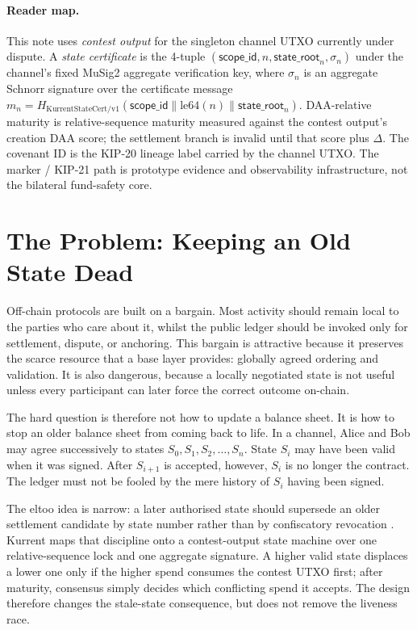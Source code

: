 \documentclass[10pt,a4paper]{article}
\begin{document}
\paragraph{Reader map.} This note uses \emph{contest output} for the singleton channel UTXO currently under dispute. A \emph{state certificate} is the 4-tuple $(\mathsf{scope\_id}, n, \mathsf{state\_root}_n, \sigma_n)$ under the channel's fixed MuSig2 aggregate verification key, where $\sigma_n$ is an aggregate Schnorr signature over the certificate message $m_n = H_{\mathrm{KurrentStateCert/v1}}(\mathsf{scope\_id} \parallel \mathrm{le64}(n) \parallel \mathsf{state\_root}_n)$. DAA-relative maturity is relative-sequence maturity measured against the contest output's creation DAA score; the settlement branch is invalid until that score plus $\Delta$. The covenant ID is the KIP-20 lineage label carried by the channel UTXO. The marker / KIP-21 path is prototype evidence and observability infrastructure, not the bilateral fund-safety core.

\section{The Problem: Keeping an Old State Dead}

Off-chain protocols are built on a bargain. Most activity should remain local to the parties who care about it, whilst the public ledger should be invoked only for settlement, dispute, or anchoring. This bargain is attractive because it preserves the scarce resource that a base layer provides: globally agreed ordering and validation. It is also dangerous, because a locally negotiated state is not useful unless every participant can later force the correct outcome on-chain.

The hard question is therefore not how to update a balance sheet. It is how to stop an older balance sheet from coming back to life. In a channel, Alice and Bob may agree successively to states $S_0, S_1, S_2, \ldots, S_n$. State $S_i$ may have been valid when it was signed. After $S_{i+1}$ is accepted, however, $S_i$ is no longer the contract. The ledger must not be fooled by the mere history of $S_i$ having been signed.

The eltoo idea is narrow: a later authorised state should supersede an older settlement candidate by state number rather than by confiscatory revocation \cite{eltoo}. Kurrent maps that discipline onto a contest-output state machine over one relative-sequence lock and one aggregate signature. A higher valid state displaces a lower one only if the higher spend consumes the contest UTXO first; after maturity, consensus simply decides which conflicting spend it accepts. The design therefore changes the stale-state consequence, but does not remove the liveness race.
\end{document}
